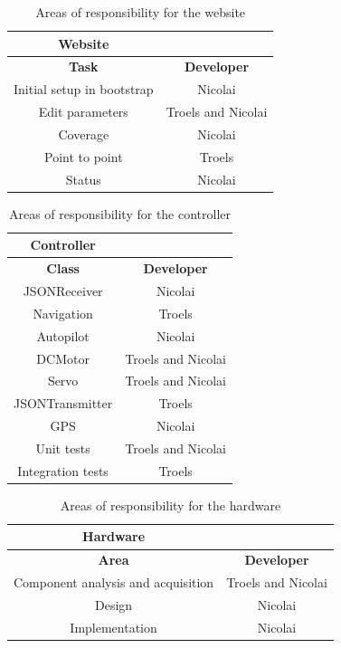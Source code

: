 \begin{table}[H]
\centering
\begin{tabular}{|c|c|}
\hline 
\textbf{Website} & \\ 
\hline 
\textbf{Task} & \textbf{Developer} \\ 
\hline 
Initial setup in bootstrap & Nicolai \\ 
\hline 
Edit parameters & Troels and Nicolai \\ 
\hline 
Coverage & Nicolai \\ 
\hline 
Point to point & Troels \\ 
\hline 
Status & Nicolai \\ 
\hline 
\end{tabular} 
\caption{Areas of responsibility for the website}
\label{table:website}
\end{table}

\begin{table}[H]
\centering
\begin{tabular}{|c|c|}
\hline 
\textbf{Controller} & \\ 
\hline 
\textbf{Class} & \textbf{Developer} \\ 
\hline 
JSONReceiver & Nicolai \\ 
\hline 
Navigation & Troels \\ 
\hline 
Autopilot & Nicolai \\ 
\hline 
DCMotor & Troels and Nicolai \\ 
\hline 
Servo & Troels and Nicolai \\ 
\hline 
JSONTransmitter & Troels \\ 
\hline 
GPS & Nicolai \\ 
\hline 
Unit tests & Troels and Nicolai \\ 
\hline 
Integration tests & Troels \\ 
\hline 
\end{tabular} 
\caption{Areas of responsibility for the controller}
\label{table:controller}
\end{table}

\begin{table}[H]
\centering
\begin{tabular}{|c|c|}
\hline 
\textbf{Hardware} & \\ 
\hline 
\textbf{Area} & \textbf{Developer} \\ 
\hline 
Component analysis and acquisition & Troels and Nicolai \\ 
\hline 
Design & Nicolai \\ 
\hline 
Implementation & Nicolai \\ 
\hline 
\end{tabular} 
\caption{Areas of responsibility for the hardware}
\label{table:hardware}
\end{table}